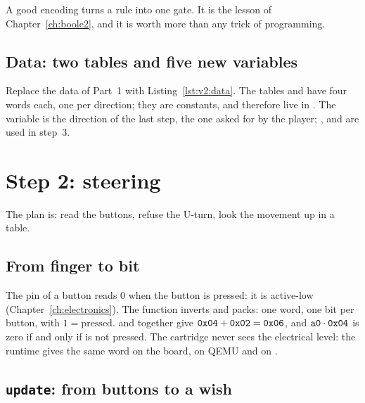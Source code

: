 \begin{prgconcept}
A good encoding turns a rule into one gate. It is the lesson of
Chapter~\ref{ch:boole2}, and it is worth more than any trick of programming.
\end{prgconcept}

\subsection{Data: two tables and five new variables}

Replace the data of Part~1 with Listing~\ref{lst:v2:data}. The tables
 and  have four words each, one per direction; they are
constants, and therefore live in . The variable  is
the direction of the last step,  the one asked for by the player;
,  and  are used in step~3.


\section{Step 2: steering}

The plan is: read the buttons, refuse the U-turn, look the movement up in a
table.

\subsection{From finger to bit}

The pin of a button reads 0 when the button is pressed: it is active-low
(Chapter~\ref{ch:electronics}). The function  inverts
and packs: one word, one bit per button, with $1=\text{pressed}$. 
and  together give $\texttt{0x04}+\texttt{0x02}=\texttt{0x06}$, and
$\texttt{a0}\cdot\texttt{0x04}$ is zero if and only if  is not pressed. The
cartridge never sees the electrical level: the runtime gives the same word on
the board, on QEMU and on \prgqt.

\subsection{\texttt{update}: from buttons to a wish}


